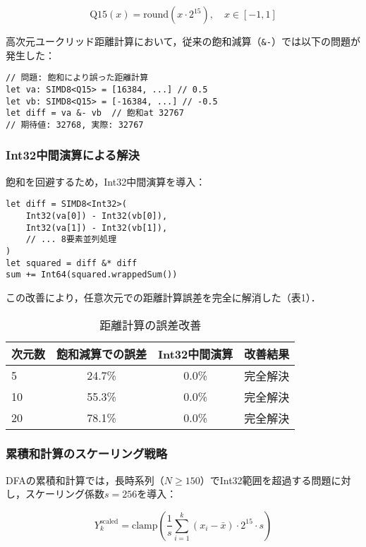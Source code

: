 \documentclass[10pt,twocolumn]{article}
\begin{document}
\begin{CJK}{UTF8}{min}
\begin{equation}
\text{Q15}(x) = \text{round}(x \cdot 2^{15}), \quad x \in [-1, 1]
\end{equation}

高次元ユークリッド距離計算において，従来の飽和減算（\verb|&-|）では以下の問題が発生した：

\begin{lstlisting}[caption=飽和問題の発生例]
// 問題: 飽和により誤った距離計算
let va: SIMD8<Q15> = [16384, ...] // 0.5
let vb: SIMD8<Q15> = [-16384, ...] // -0.5
let diff = va &- vb  // 飽和at 32767
// 期待値: 32768, 実際: 32767
\end{lstlisting}

\subsubsection{Int32中間演算による解決}
飽和を回避するため，Int32中間演算を導入：

\begin{lstlisting}[caption=Int32中間演算による解決]
let diff = SIMD8<Int32>(
    Int32(va[0]) - Int32(vb[0]),
    Int32(va[1]) - Int32(vb[1]),
    // ... 8要素並列処理
)
let squared = diff &* diff
sum += Int64(squared.wrappedSum())
\end{lstlisting}

この改善により，任意次元での距離計算誤差を完全に解消した（表1）．

\begin{table}[t]
\caption{距離計算の誤差改善}
\centering
\begin{tabular}{lccc}
\toprule
次元数 & 飽和減算での誤差 & Int32中間演算 & 改善結果 \\
\midrule
5 & 24.7\% & 0.0\% & 完全解決 \\
10 & 55.3\% & 0.0\% & 完全解決 \\
20 & 78.1\% & 0.0\% & 完全解決 \\
\bottomrule
\end{tabular}
\end{table}

\subsubsection{累積和計算のスケーリング戦略}
DFAの累積和計算では，長時系列（$N \geq 150$）でInt32範囲を超過する問題に対し，スケーリング係数$s=256$を導入：

\begin{equation}
Y_k^{\text{scaled}} = \text{clamp}\left(\frac{1}{s} \sum_{i=1}^{k} (x_i - \bar{x}) \cdot 2^{15} \cdot s\right)
\end{equation}


\end{CJK}
\end{document}
